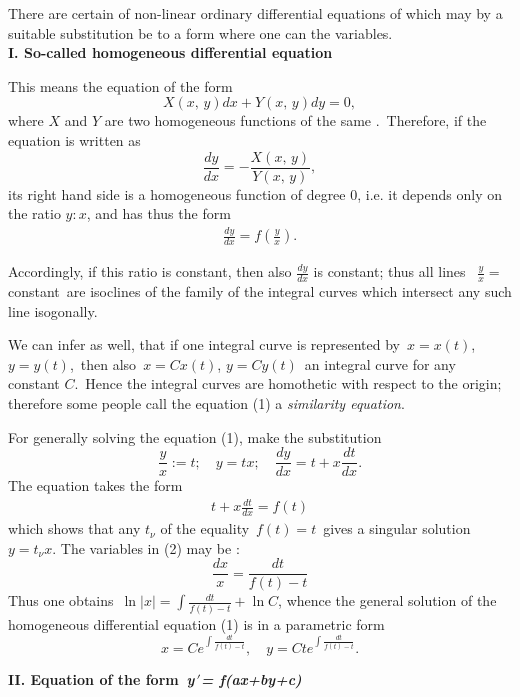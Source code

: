 \documentclass[12pt]{article}
\theoremstyle{definition}
\begin{document}
There are certain  of non-linear ordinary differential equations of  which may by a suitable substitution be  to a form where one can  the variables.\\

\textbf{I.\; So-called homogeneous differential equation}

This means the equation of the form
$$X(x,\,y)dx+Y(x,\,y)dy = 0,$$
where $X$ and $Y$ are two homogeneous functions of the same .\, Therefore, if the equation is written as
$$\frac{dy}{dx} = -\frac{X(x,\,y)}{Y(x,\,y)},$$
its right hand side is a homogeneous function of degree 0, i.e. it depends only on the ratio $y\!:\!x$, and has thus the form
\begin{align}
\frac{dy}{dx} = f\left(\frac{y}{x}\right).
\end{align}

Accordingly, if this ratio is constant, then also $\frac{dy}{dx}$ is constant; thus all lines \, $\frac{y}{x} =$ constant\, are isoclines of the family of the integral curves which intersect any such line isogonally.

We can infer as well, that if one integral curve is represented by\, $x = x(t)$,\; $y = y(t)$,\, then also\, $x = Cx(t)$,\; $y = Cy(t)$\,  an integral curve for any constant $C$.\, Hence the integral curves are homothetic with respect to the origin; therefore some people call the equation (1) a {\em similarity equation}.

For generally solving the equation (1), make the substitution
$$\frac{y}{x} := t; \quad y = tx; \quad \frac{dy}{dx} = t+x\frac{dt}{dx}.$$
The equation takes the form
\begin{align}
t+x\frac{dt}{dx} = f(t)
\end{align}
which shows that any  $t_\nu$ of the equality \,$f(t) = t$\, gives a singular solution \, $y = t_\nu x$.
The variables in (2) may be :
$$\frac{dx}{x} = \frac{dt}{f(t)\!-\!t}$$
Thus one obtains\, $\ln{|x|} = \int\!\frac{dt}{f(t)\!-\!t}+ \ln{C}$, whence the general solution of the homogeneous differential equation (1) is in a parametric form
$$x = Ce^{\int\!\frac{dt}{f(t)\!-\!t}}, \quad y = Cte^{\int\!\frac{dt}{f(t)\!-\!t}}.$$



\textbf{II.\; Equation of the form\, {\em y}$\,'${\em = f(ax+by+c)}}
\end{document}
